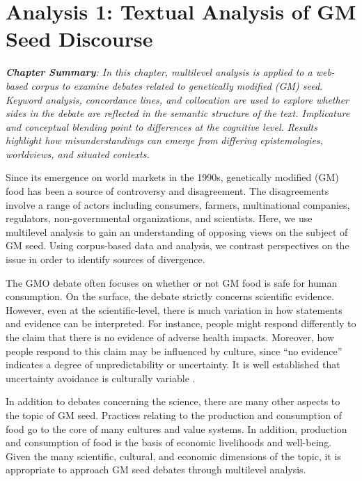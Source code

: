 \chapter{Analysis 1: Textual Analysis of GM Seed Discourse}

\textit{\textbf{Chapter Summary}: In this chapter, multilevel analysis is applied to a web-based corpus to examine debates related to genetically modified (GM) seed. Keyword analysis, concordance lines, and collocation are used to explore whether sides in the debate are reflected in the semantic structure of the text. Implicature and conceptual blending point to differences at the cognitive level. Results highlight how misunderstandings can emerge from differing epistemologies, worldviews, and situated contexts.}
\newline

Since its emergence on world markets in the 1990s, genetically modified (GM) food has been a source of controversy and disagreement. The disagreements involve a range of actors including consumers, farmers, multinational companies, regulators, non-governmental organizations, and scientists. Here, we use multilevel analysis to gain an understanding of opposing views on the subject of GM seed. Using corpus-based data and analysis, we contrast perspectives on the issue in order to identify sources of divergence. 	

The GMO debate often focuses on whether or not GM food is safe for human consumption. On the surface, the debate strictly concerns scientific evidence. However, even at the scientific-level, there is much variation in how statements and evidence can be interpreted. For instance, people might respond differently to the claim that there is no evidence of adverse health impacts. Moreover, how people respond to this claim may be influenced by culture, since ``no evidence'' indicates a degree of unpredictability or uncertainty. It is well established that uncertainty avoidance is culturally variable \citep{McCornack2017}.

In addition to debates concerning the science, there are many other aspects to the topic of GM seed. Practices relating to the production and consumption of food go to the core of many cultures and value systems. In addition, production and consumption of food is the basis of economic livelihoods and well-being. Given the many scientific, cultural, and economic dimensions of the topic, it is appropriate to approach GM seed debates through multilevel analysis. 

